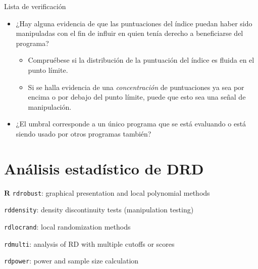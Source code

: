 \documentclass[
  ignorenonframetext,
]{beamer}
\providecommand{\tightlist}{%
  \setlength{\itemsep}{0pt}\setlength{\parskip}{0pt}}
\begin{document}
\begin{frame}{Lista de verificación}
\protect\hypertarget{lista-de-verificaciuxf3n-1}{}
\begin{itemize}
\tightlist
\item
  ¿Hay alguna evidencia de que las puntuaciones del índice puedan haber
  sido manipuladas con el fin de influir en quien tenía derecho a
  beneficiarse del programa?

  \begin{itemize}
  \tightlist
  \item
    Compruébese si la distribución de la puntuación del índice es fluida
    en el punto límite.
  \item
    Si se halla evidencia de una \emph{concentración} de puntuaciones ya
    sea por encima o por debajo del punto límite, puede que esto sea una
    señal de manipulación. \pause
  \end{itemize}
\item
  ¿El umbral corresponde a un único programa que se está evaluando o
  está siendo usado por otros programas también?
\end{itemize}
\end{frame}

\hypertarget{anuxe1lisis-estaduxedstico-de-drd}{%
\section{Análisis estadístico de
DRD}\label{anuxe1lisis-estaduxedstico-de-drd}}

\begin{frame}[fragile]{\(\textbf{R}\)}
\protect\hypertarget{textbfr}{}
\texttt{rdrobust}: graphical presentation and local polynomial methods

\texttt{rddensity}: density discontinuity tests (manipulation testing)

\texttt{rdlocrand}: local randomization methods

\texttt{rdmulti}: analysis of RD with multiple cutoffs or scores

\texttt{rdpower}: power and sample size calculation
\end{frame}
\end{document}
